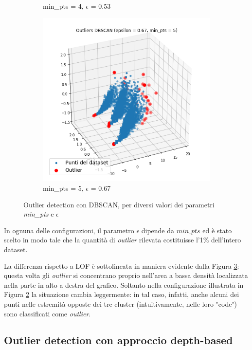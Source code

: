 \documentclass[a4paper]{article}
\begin{document}
\begin{figure}[h]
\begin{subfigure}[b]{.32\linewidth}
\caption{min\_pts = 4, $\epsilon$ = 0.53}
\label{subfig:dbscan2}
\end{subfigure}
\begin{subfigure}[b]{.32\linewidth}
\includegraphics[width=\linewidth]{images/dbscan_min_pts_5.png}
\caption{min\_pts = 5, $\epsilon$ = 0.67}
\label{subfig:dbscan3}
\end{subfigure}
\caption{Outlier detection con DBSCAN, per diversi valori dei parametri \textit{min\_pts} e $\epsilon$}
\label{fig:dbscans}
\end{figure}

\noindent
In ognuna delle configurazioni, il parametro $\epsilon$ dipende da $min\_pts$ ed è stato scelto in modo tale che la quantità di \textit{outlier} rilevata costituisse l'1\% dell'intero dataset.

La differenza rispetto a LOF è sottolineata in maniera evidente dalla Figura \ref{fig:dbscans}: questa volta gli \textit{outlier} si concentrano proprio nell'area a bassa densità localizzata nella parte in alto a destra del grafico. Soltanto nella configurazione illustrata in Figura \ref{subfig:dbscan3} la situazione cambia leggermente: in tal caso, infatti, anche alcuni dei punti nelle estremità opposte dei tre cluster (intuitivamente, nelle loro "code") sono classificati come \textit{outlier}.

\subsection{Outlier detection con approccio depth-based}
\end{document}

